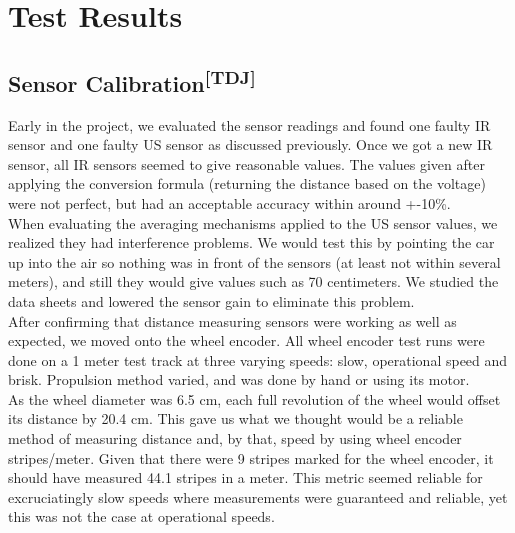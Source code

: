 \chapter{Test Results}
\section[Sensor Calibration]{Sensor Calibration\textsuperscript{[TDJ]}}
Early in the project, we evaluated the sensor readings and found one faulty IR
sensor and one faulty US sensor as discussed previously. Once we got a new IR
sensor, all IR sensors seemed to give reasonable values. The values given after
applying the conversion formula (returning the distance based on the voltage)
were not perfect, but had an acceptable accuracy within around +-10\%.\\

\noindent
When evaluating the averaging mechanisms applied to the US sensor values, we
realized they had interference problems. We would test this by pointing the car
up into the air so nothing was in front of the sensors (at least not within
several meters), and still they would give values such as 70 centimeters. We
studied the data sheets and lowered the sensor gain to eliminate this problem.\\

\noindent
After confirming that distance measuring sensors were working as well as
expected, we moved onto the wheel encoder. All wheel encoder test runs were done
on a 1 meter test track at three varying speeds: slow, operational speed and
brisk. Propulsion method varied, and was done by hand or using its motor.\\

\noindent
As the wheel diameter was 6.5 cm, each full revolution of the wheel would offset
its distance by 20.4 cm. This gave us what we thought would be a reliable method
of measuring distance and, by that, speed by using wheel encoder stripes/meter.
Given that there were 9 stripes marked for the wheel encoder, it should have
measured 44.1 stripes in a meter. This metric seemed reliable for excruciatingly
slow speeds where measurements were guaranteed and reliable, yet this was not
the case at operational speeds.\\

